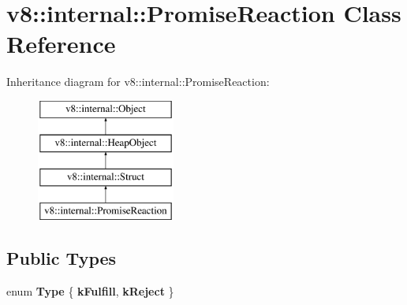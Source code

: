 \hypertarget{classv8_1_1internal_1_1PromiseReaction}{}\section{v8\+:\+:internal\+:\+:Promise\+Reaction Class Reference}
\label{classv8_1_1internal_1_1PromiseReaction}
Inheritance diagram for v8\+:\+:internal\+:\+:Promise\+Reaction\+:\begin{figure}[H]
\begin{center}
\leavevmode
\includegraphics[height=4.000000cm]{classv8_1_1internal_1_1PromiseReaction}
\end{center}
\end{figure}
\subsection*{Public Types}
\begin{DoxyCompactItemize}
\item 
\mbox{\label{classv8_1_1internal_1_1PromiseReaction_ae58c48378eaa38b1b27e354e38929cb7}} 
enum {\bfseries Type} \{ {\bfseries k\+Fulfill}, 
{\bfseries k\+Reject}
 \}
\end{DoxyCompactItemize}
